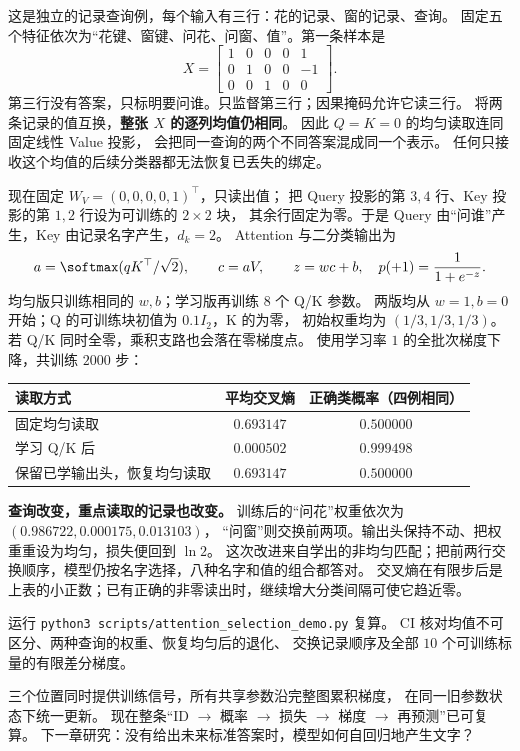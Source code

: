 这是独立的记录查询例，每个输入有三行：花的记录、窗的记录、查询。
固定五个特征依次为“花键、窗键、问花、问窗、值”。第一条样本是
\[
X=\begin{bmatrix}1&0&0&0&1\\0&1&0&0&-1\\0&0&1&0&0\end{bmatrix}.
\]
第三行没有答案，只标明要问谁。只监督第三行；因果掩码允许它读三行。
将两条记录的值互换，\textbf{整张 $X$ 的逐列均值仍相同}。
因此 $Q=K=0$ 的均匀读取连同固定线性 Value 投影，
会把同一查询的两个不同答案混成同一个表示。
任何只接收这个均值的后续分类器都无法恢复已丢失的绑定。

现在固定 $W_V=(0,0,0,0,1)^\top$，只读出值；
把 Query 投影的第 $3,4$ 行、Key 投影的第 $1,2$ 行设为可训练的 $2\times2$ 块，
其余行固定为零。于是 Query 由“问谁”产生，Key 由记录名字产生，$d_k=2$。
Attention 与二分类输出为
\[
a=\softmax(qK^\top/\sqrt2),\qquad c=aV,\qquad
z=wc+b,\quad p(+1)=\frac{1}{1+e^{-z}}.
\]
均匀版只训练相同的 $w,b$；学习版再训练 $8$ 个 Q/K 参数。
两版均从 $w=1,b=0$ 开始；Q 的可训练块初值为 $0.1I_2$，K 的为零，
初始权重均为 $(1/3,1/3,1/3)$。若 Q/K 同时全零，乘积支路也会落在零梯度点。
使用学习率 $1$ 的全批次梯度下降，共训练 $2000$ 步：
\begin{center}\small
{}
\begin{tabular}{@{}lcc@{}}\toprule
读取方式 & 平均交叉熵 & 正确类概率（四例相同）\\\midrule
固定均匀读取 & $0.693147$ & $0.500000$\\
学习 Q/K 后 & $0.000502$ & $0.999498$\\
保留已学输出头，恢复均匀读取 & $0.693147$ & $0.500000$\\\bottomrule
\end{tabular}
\end{center}

\textbf{查询改变，重点读取的记录也改变。}
训练后的“问花”权重依次为 $(0.986722,0.000175,0.013103)$，
“问窗”则交换前两项。输出头保持不动、把权重重设为均匀，损失便回到 $\ln2$。
这次改进来自学出的非均匀匹配；把前两行交换顺序，模型仍按名字选择，八种名字和值的组合都答对。
交叉熵在有限步后是上表的小正数；已有正确的非零读出时，继续增大分类间隔可使它趋近零。

运行 \texttt{python3 scripts/attention\_selection\_demo.py} 复算。
CI 核对均值不可区分、两种查询的权重、恢复均匀后的退化、
交换记录顺序及全部 $10$ 个可训练标量的有限差分梯度。



\par\smallskip
三个位置同时提供训练信号，所有共享参数沿完整图累积梯度，
在同一旧参数状态下统一更新。
现在整条“ID $\to$ 概率 $\to$ 损失 $\to$ 梯度 $\to$ 再预测”已可复算。
下一章研究：没有给出未来标准答案时，模型如何自回归地产生文字？\label{route:joint-all-end}
